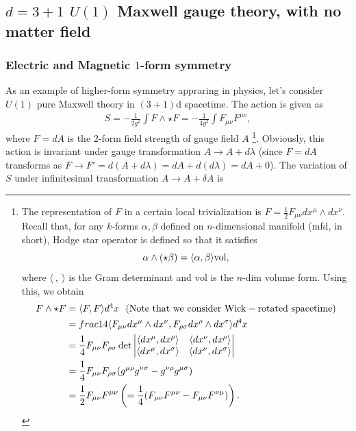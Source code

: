 \documentclass{ltjsarticle}
\theoremstyle{mystyle} %
\numberwithin{equation}{section}
\begin{document}
\subsection{$d=3+1$ $U(1)$ Maxwell gauge theory, with no matter field}
\subsubsection{Electric and Magnetic $1$-form symmetry}
As an example of higher-form symmetry appraring in physics, let's consider $U(1)$ pure Maxwell theory in $(3+1)$d spacetime. 
The action is given as 
\begin{align}
    S = -\frac{1}{2g^2} \int F\wedge \star F = -\frac{1}{4g^2}\int F_{\mu\nu}F^{\mu\nu}, 
    \label{U1pure}
\end{align}
where $F=dA$ is the 2-form field strength of gauge field $A$
\footnote{
    The representation of $F$ in a certain local trivialization is $F=\frac{1}{2}F_{\mu\nu}dx^\mu \wedge dx^\nu$. 
    Recall that, for any $k$-forms $\alpha, \beta$ defined on $n$-dimensional manifold (mfd, in short), 
    Hodge star operator is defined so that it satisfies
    $$\alpha\wedge (\star \beta)=\langle{\alpha, \beta}\rangle\mathrm{vol}, $$
    where $\langle ~ , ~ \rangle$ is the Gram determinant and $\mathrm{vol}$ is the $n$-dim volume form. 
    Using this, we obtain
    \begin{align}
        F\wedge \star F &= \langle{F, F}\rangle d^4 x~~(\mathrm{Note~that~we~consider~Wick-rotated~spacetime})\\
        &=frac{1}{4}\langle{F_{\mu\nu}dx^\mu\wedge dx^\nu, F_{\rho\sigma}dx^\rho\wedge dx^\sigma}\rangle d^4 x\\
        &=\frac{1}{4}F_{\mu\nu}F_{\rho\sigma}\det
        \begin{vmatrix}
            \langle{dx^\mu, dx^\rho}\rangle & \langle{dx^\nu, dx^\rho}\rangle\\
            \langle{dx^\mu, dx^\sigma}\rangle & \langle{dx^\nu, dx^\sigma}\rangle\\
        \end{vmatrix}\\
        &= \frac{1}{4}F_{\mu\nu}F_{\rho\sigma}(g^{\mu\rho}g^{\nu\sigma}-g^{\nu\rho}g^{\mu\sigma})\\
        &= \frac{1}{2}F_{\mu\nu}F^{\mu\nu} \left({=\frac{1}{4}(F_{\mu\nu}F^{\mu\nu}-F_{\mu\nu}F^{\nu\mu})}\right). 
    \end{align}
}. Obviously, this action is invariant under gauge transformation $A\to A+d\lambda$ (since $F=dA$ transforms as 
$F\to F' = d(A+d\lambda) = dA + d(d\lambda) = dA +0$). 
The variation of $S$ under infinitesimal transformation $A\to A + \delta A$ is 
\end{document}
